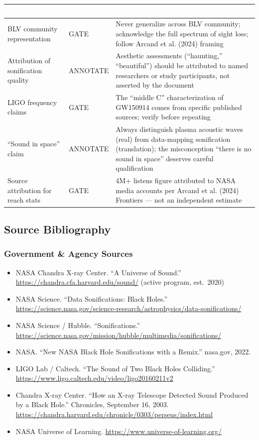 \documentclass[11pt,letterpaper]{article}
\newcommand{\tableheader}[1]{\textbf{\sffamily\textcolor{white}{#1}}}
\begin{document}
\begin{center}
\begin{tabularx}{\textwidth}{L{4cm}L{2cm}X}
\toprule
{}
\tableheader{Domain} & \tableheader{Level} & \tableheader{Guidance} \\
\midrule
BLV community representation & GATE & Never generalize across BLV community; acknowledge the full spectrum of sight loss; follow Arcand et al. (2024) framing \\
Attribution of sonification quality & ANNOTATE & Aesthetic assessments (``haunting,'' ``beautiful'') should be attributed to named researchers or study participants, not asserted by the document \\
LIGO frequency claims & GATE & The ``middle C'' characterization of GW150914 comes from specific published sources; verify before repeating \\
``Sound in space'' claim & ANNOTATE & Always distinguish plasma acoustic waves (real) from data-mapping sonification (translation); the misconception ``there is no sound in space'' deserves careful qualification \\
Source attribution for reach stats & GATE & 4M+ listens figure attributed to NASA media accounts per Arcand et al. (2024) Frontiers — not an independent estimate \\
\bottomrule
\end{tabularx}
\end{center}

\subsection{Source Bibliography}

\subsubsection{Government \& Agency Sources}

\begin{itemize}
  \item NASA Chandra X-ray Center. ``A Universe of Sound.'' \url{https://chandra.cfa.harvard.edu/sound/} (active program, est.\ 2020)
  \item NASA Science. ``Data Sonifications: Black Holes.'' \url{https://science.nasa.gov/science-research/astrophysics/data-sonifications/}
  \item NASA Science / Hubble. ``Sonifications.'' \url{https://science.nasa.gov/mission/hubble/multimedia/sonifications/}
  \item NASA. ``New NASA Black Hole Sonifications with a Remix.'' nasa.gov, 2022.
  \item LIGO Lab / Caltech. ``The Sound of Two Black Holes Colliding.'' \url{https://www.ligo.caltech.edu/video/ligo20160211v2}
  \item Chandra X-ray Center. ``How an X-ray Telescope Detected Sound Produced by a Black Hole.'' Chronicles, September 16, 2003. \url{https://chandra.harvard.edu/chronicle/0303/perseus/index.html}
  \item NASA Universe of Learning. \url{https://www.universe-of-learning.org/}
\end{itemize}
\end{document}
